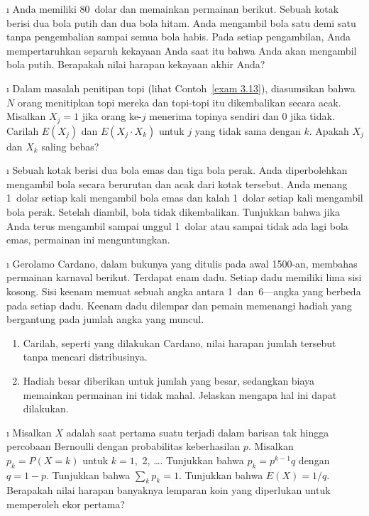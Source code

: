 \begin{LJSItem}
\i\label{exer 6.1.13} Anda memiliki 80~dolar dan memainkan permainan berikut. Sebuah kotak
berisi dua bola putih dan dua bola hitam. Anda mengambil bola satu demi satu
tanpa pengembalian sampai semua bola habis. Pada setiap pengambilan, Anda mempertaruhkan separuh
kekayaan Anda saat itu bahwa Anda akan mengambil bola putih. Berapakah nilai harapan kekayaan akhir Anda?

\i\label{exer 6.1.14} Dalam masalah penitipan topi (lihat Contoh~\ref{exam 3.13}),
diasumsikan bahwa $N$ orang menitipkan topi mereka dan topi-topi itu dikembalikan
secara acak. Misalkan $X_j = 1$ jika orang ke-$j$ menerima topinya sendiri dan 0
jika tidak. Carilah $E(X_j)$ dan $E(X_j \cdot X_k)$ untuk $j$ yang tidak sama dengan $k$. Apakah $X_j$
dan $X_k$ saling bebas?

\i\label{exer 6.1.16} Sebuah kotak berisi dua bola emas dan tiga bola perak. Anda
diperbolehkan mengambil bola secara berurutan dan acak dari kotak tersebut. Anda menang 1~dolar
setiap kali mengambil bola emas dan kalah 1~dolar setiap kali mengambil bola perak.
Setelah diambil, bola tidak dikembalikan. Tunjukkan bahwa jika Anda terus mengambil sampai unggul
1~dolar atau sampai tidak ada lagi bola emas, permainan ini menguntungkan.

\i\label{exer 6.1.17} Gerolamo Cardano, dalam bukunya 
yang ditulis pada awal 1500-an, membahas permainan karnaval berikut. Terdapat enam
dadu. Setiap dadu memiliki lima sisi kosong. Sisi keenam memuat sebuah angka antara
1~dan~6---angka yang berbeda pada setiap dadu. Keenam dadu dilempar dan pemain
memenangi hadiah yang bergantung pada jumlah angka yang muncul.

\begin{enumerate}
\item Carilah, seperti yang dilakukan Cardano, nilai harapan jumlah tersebut tanpa mencari distribusinya.

\item Hadiah besar diberikan untuk jumlah yang besar, sedangkan biaya memainkan permainan ini tidak mahal.
Jelaskan mengapa hal ini dapat dilakukan.
\end{enumerate}

\i\label{exer 6.1.18} Misalkan $X$ adalah saat pertama suatu  terjadi dalam
barisan tak hingga percobaan Bernoulli dengan probabilitas keberhasilan $p$. Misalkan $p_k
= P(X = k)$ untuk $k = 1$,~2, \dots. Tunjukkan bahwa $p_k = p^{k - 1}q$ dengan $q = 1 - p$.
Tunjukkan bahwa $\sum_k p_k = 1$. Tunjukkan bahwa $E(X) = 1/q$. Berapakah nilai harapan banyaknya
lemparan koin yang diperlukan untuk memperoleh ekor pertama?


\end{LJSItem}
